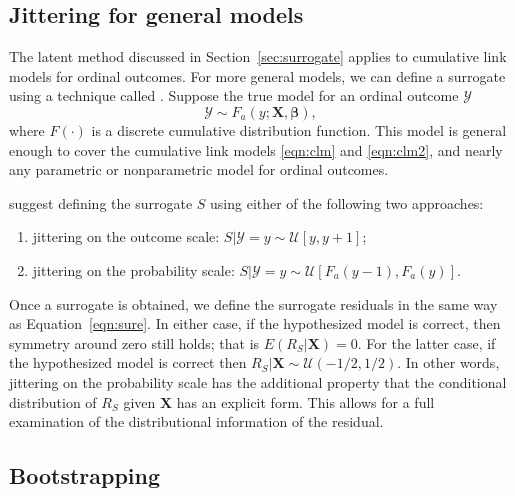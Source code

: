 \subsection{Jittering for general models}
\label{sec:jittering}

The latent method discussed in Section~\ref{sec:surrogate} applies to cumulative link models for ordinal outcomes. For more general models, we can define a surrogate using a technique called . Suppose the true model for an ordinal outcome $\mathcal{Y}$
\begin{equation}
  \mathcal{Y} \sim F_a\left(y; \boldsymbol{X}, \boldsymbol{\beta}\right),
\end{equation}
where $F\left(\cdot\right)$ is a discrete cumulative distribution function. This model is general enough to cover the cumulative link models \eqref{eqn:clm} and \eqref{eqn:clm2}, and nearly any parametric or nonparametric model for ordinal outcomes.

\citet{residuals-liu-2017} suggest defining the surrogate $S$ using either of the following two approaches:
\begin{enumerate}
  \item jittering on the outcome scale: $S | \mathcal{Y} = y \sim \mathcal{U}\left[y, y + 1\right]$;
  \item jittering on the probability scale: $S | \mathcal{Y} = y \sim \mathcal{U}\left[F_a\left(y - 1\right), F_a\left(y\right)\right]$.
\end{enumerate}
Once a surrogate is obtained, we define the surrogate residuals in the same way as Equation~\eqref{eqn:sure}.
In either case, if the hypothesized model is correct, then symmetry around zero still holds; that is $E\left(R_S | \boldsymbol{X}\right) = 0$. For the latter case, if the hypothesized model is correct then $R_S | \boldsymbol{X} \sim \mathcal{U}\left(-1/2, 1/2\right)$. In other words, jittering on the probability scale has the additional property that the conditional distribution of $R_S$ given $\boldsymbol{X}$ has an explicit form. This allows for a full examination of the distributional information of the residual.


\subsection{Bootstrapping}

